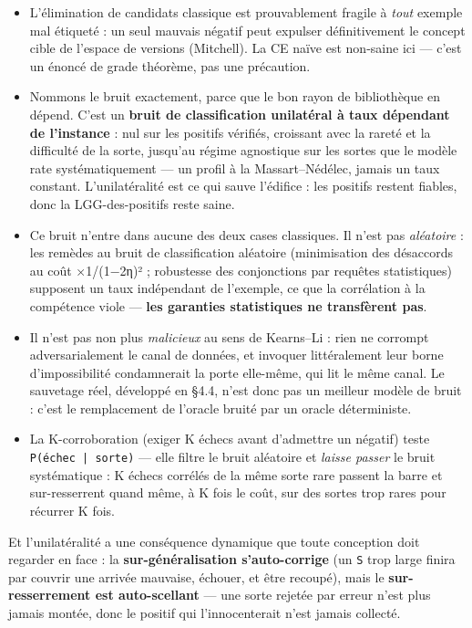 \documentclass[11pt]{article}
\begin{document}
\begin{itemize}
\item L'élimination de candidats classique est prouvablement fragile à \emph{tout} exemple mal étiqueté : un seul mauvais négatif peut expulser définitivement le concept cible de l'espace de versions (Mitchell). La CE naïve est non-saine ici — c'est un énoncé de grade théorème, pas une précaution.
\item Nommons le bruit exactement, parce que le bon rayon de bibliothèque en dépend. C'est un \textbf{bruit de classification unilatéral à taux dépendant de l'instance} : nul sur les positifs vérifiés, croissant avec la rareté et la difficulté de la sorte, jusqu'au régime agnostique sur les sortes que le modèle rate systématiquement — un profil à la Massart–Nédélec, jamais un taux constant. L'unilatéralité est ce qui sauve l'édifice : les positifs restent fiables, donc la LGG-des-positifs reste saine.
\item Ce bruit n'entre dans aucune des deux cases classiques. Il n'est pas \emph{aléatoire} : les remèdes au bruit de classification aléatoire (minimisation des désaccords au coût ×1/(1−2η)² ; robustesse des conjonctions par requêtes statistiques) supposent un taux indépendant de l'exemple, ce que la corrélation à la compétence viole — \textbf{les garanties statistiques ne transfèrent pas}.
\item Il n'est pas non plus \emph{malicieux} au sens de Kearns–Li : rien ne corrompt adversarialement le canal de données, et invoquer littéralement leur borne d'impossibilité condamnerait la porte elle-même, qui lit le même canal. Le sauvetage réel, développé en §4.4, n'est donc pas un meilleur modèle de bruit : c'est le remplacement de l'oracle bruité par un oracle déterministe.
\item La K-corroboration (exiger K échecs avant d'admettre un négatif) teste \texttt{P(échec | sorte)} — elle filtre le bruit aléatoire et \emph{laisse passer} le bruit systématique : K échecs corrélés de la même sorte rare passent la barre et sur-resserrent quand même, à K fois le coût, sur des sortes trop rares pour récurrer K fois.
\end{itemize}

Et l'unilatéralité a une conséquence dynamique que toute conception doit regarder en face : la \textbf{sur-généralisation s'auto-corrige} (un \texttt{S} trop large finira par couvrir une arrivée mauvaise, échouer, et être recoupé), mais le \textbf{sur-resserrement est auto-scellant} — une sorte rejetée par erreur n'est plus jamais montée, donc le positif qui l'innocenterait n'est jamais collecté.
\end{document}
